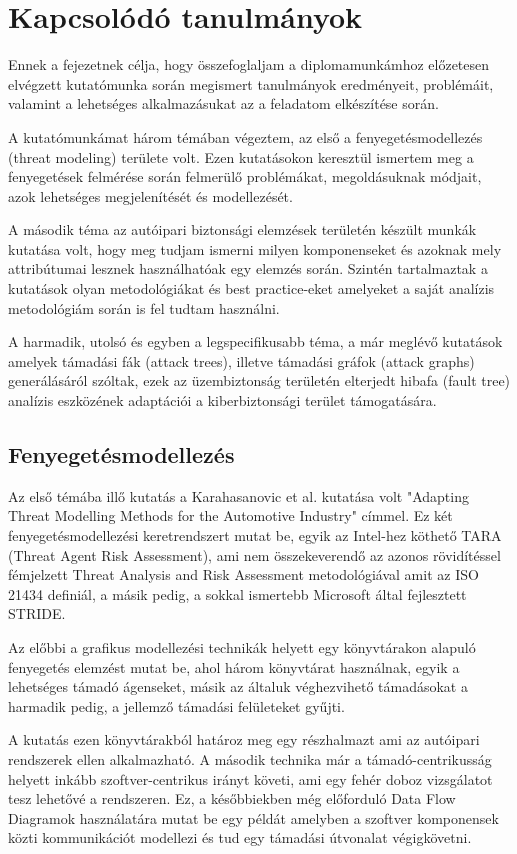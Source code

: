 \chapter{Kapcsolódó tanulmányok}
Ennek a fejezetnek célja, hogy összefoglaljam a diplomamunkámhoz előzetesen elvégzett kutatómunka során megismert tanulmányok eredményeit, problémáit, valamint a lehetséges alkalmazásukat az a feladatom elkészítése során.

A kutatómunkámat három témában végeztem, az első a fenyegetésmodellezés (threat modeling) területe volt. Ezen kutatásokon keresztül ismertem meg a fenyegetések felmérése során felmerülő problémákat, megoldásuknak módjait, azok lehetséges megjelenítését és modellezését.

A második téma az autóipari biztonsági elemzések területén készült munkák kutatása volt, hogy meg tudjam ismerni milyen komponenseket és azoknak mely attribútumai lesznek használhatóak egy elemzés során. Szintén tartalmaztak a kutatások olyan metodológiákat és best practice-eket amelyeket a saját analízis metodológiám során is fel tudtam használni.

A harmadik, utolsó és egyben a legspecifikusabb téma, a már meglévő kutatások amelyek támadási fák (attack trees), illetve támadási gráfok (attack graphs) generálásáról szóltak, ezek az üzembiztonság területén elterjedt hibafa (fault tree) analízis eszközének adaptációi a kiberbiztonsági terület támogatására.

\section{Fenyegetésmodellezés}

Az első témába illő kutatás a Karahasanovic et al.\cite{Karahasanovic} kutatása volt "Adapting Threat Modelling Methods for the Automotive Industry" címmel. Ez két fenyegetésmodellezési keretrendszert mutat be, egyik az Intel-hez köthető TARA (Threat Agent Risk Assessment), ami nem összekeverendő az azonos rövidítéssel fémjelzett Threat Analysis and Risk Assessment metodológiával amit az ISO 21434 definiál, a másik pedig, a sokkal ismertebb Microsoft által fejlesztett STRIDE. 

Az előbbi a grafikus modellezési technikák helyett egy könyvtárakon alapuló fenyegetés elemzést mutat be, ahol három könyvtárat használnak, egyik a lehetséges támadó ágenseket, másik az általuk véghezvihető támadásokat a harmadik pedig, a jellemző támadási felületeket gyűjti. 

A kutatás ezen könyvtárakból határoz meg egy részhalmazt ami az autóipari rendszerek ellen alkalmazható. A második technika már a támadó-centrikusság helyett inkább szoftver-centrikus irányt követi, ami egy fehér doboz vizsgálatot tesz lehetővé a rendszeren. Ez, a későbbiekben még előforduló Data Flow Diagramok használatára mutat be egy példát amelyben a szoftver komponensek közti kommunikációt modellezi és tud egy támadási útvonalat végigkövetni. 

